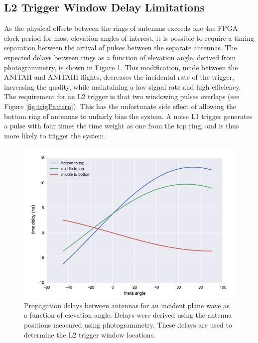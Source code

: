 				
	\subsection{L2 Trigger Window Delay Limitations}
		As the physical offsets between the rings of antennas exceeds one 4ns FPGA clock period for most elevation angles of interest, it is possible to require a timing separation between the arrival of pulses between the separate antennas.  The expected delays between rings as a function of elevation angle, derived from photogrammetry, is shown in Figure \ref{fig:PhysicalDelays}.  This modification, made between the ANITAII and ANITAIII flights, decreases the incidental rate of the trigger, increasing the quality, while maintaining a low signal rate and high efficiency.  The requirement for an L2 trigger is that two windowing pulses overlaps (see Figure \ref{fig:trigPattern}).  This has the unfortunate side effect of allowing the bottom ring of antennas to unfairly bias the system. A noise L1 trigger generates a pulse with four times the time weight as one from the top ring, and is thus more likely to trigger the system.  
		
			
\begin{figure}
	\centering
	\includegraphics[width=\textwidth]{figures/PhysicalDelays}
	\caption{Propagation delays between antennas for an incident plane wave as a function of elevation angle.  Delays were derived using the antenna positions measured using photogrammetry.  These delays are used to determine the L2 trigger window locations.}
	\label{fig:PhysicalDelays}
\end{figure}	
		
